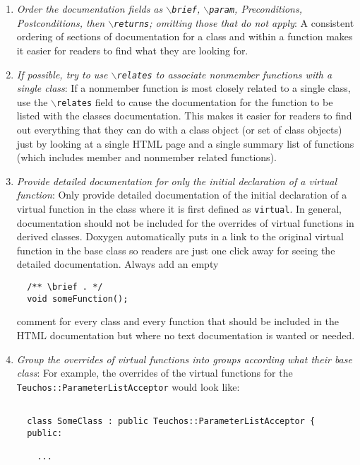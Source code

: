 \begin{enumerate}
{}\item\textit{Order the documentation fields as {}\texttt{$\backslash$brief},
{}\texttt{$\backslash$param}, Preconditions, Postconditions, then
{}\texttt{$\backslash$returns}; omitting those that do not apply}: A
consistent ordering of sections of documentation for a class and within a
function makes it easier for readers to find what they are looking for.

{}\item\textit{If possible, try to use {}\texttt{$\backslash$relates} to
associate nonmember functions with a single class}: If a nonmember function
is most closely related to a single class, use the
{}\texttt{$\backslash$relates} field to cause the documentation for the
function to be listed with the classes documentation.  This makes it easier
for readers to find out everything that they can do with a class object (or
set of class objects) just by looking at a single HTML page and a single
summary list of functions (which includes member and nonmember related
functions).

{}\item\textit{Provide detailed documentation for only the initial declaration
of a virtual function}: Only provide detailed documentation of the initial
declaration of a virtual function in the class where it is first defined as
{}\texttt{virtual}.  In general, documentation should not be included for the
overrides of virtual functions in derived classes.  Doxygen automatically puts
in a link to the original virtual function in the base class so readers are
just one click away for seeing the detailed documentation.  Always add an
empty
%
{\small\begin{verbatim}
  /** \brief . */
  void someFunction();
\end{verbatim}}
%
comment for every class and every function that should be included in the HTML
documentation but where no text documentation is wanted or needed.

{}\item\textit{Group the overrides of virtual functions into groups according
what their base class}: For example, the overrides of the virtual functions
for the {}\texttt{Teuchos\-::Parameter\-List\-Acceptor} would look like:

{\small\begin{verbatim}

  class SomeClass : public Teuchos::ParameterListAcceptor {
  public:

    ...


\end{verbatim}}
\end{enumerate}
